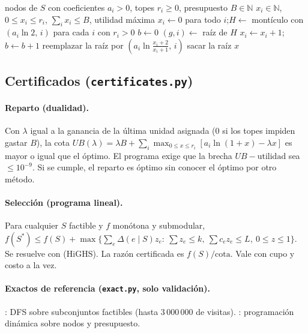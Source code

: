 \documentclass[11pt,a4paper]{article}
\newcommand{\Nat}{\mathbb{N}}
\begin{document}
\begin{algorithm}[ht]
\caption{Reparto voraz con montículo (Parte 1)}\label{alg:reparto}
\begin{algorithmic}[1]
\Require nodos de $S$ con coeficientes $a_i>0$, topes $r_i\ge 0$, presupuesto $B\in\Nat$
\Ensure $x_i\in\Nat$, $0\le x_i\le r_i$, $\sum_i x_i\le B$, utilidad máxima
\State $x_i\gets 0$ para todo $i$;\quad $H\gets$ montículo con $(a_i\ln 2,\,i)$ para cada $i$ con $r_i>0$
\State $b\gets 0$
  \State $(g,i)\gets$ raíz de $H$ 
  \State $x_i\gets x_i+1$;\quad $b\gets b+1$
   \State reemplazar la raíz por $(a_i\ln\frac{x_i+2}{x_i+1},\,i)$
  \Else \State sacar la raíz
  \EndIf
\EndWhile
\State \Return $x$
\end{algorithmic}
\end{algorithm}

\subsection{Certificados (\texttt{certificates.py})}

\paragraph{Reparto (dualidad).} Con $\lambda$ igual a la ganancia de la última unidad asignada (0 si los topes impiden gastar $B$), la cota $UB(\lambda)=\lambda B+\sum_i \max_{0\le x\le r_i}[a_i\ln(1+x)-\lambda x]$ es mayor o igual que el óptimo. El programa exige que la brecha $UB-\text{utilidad}$ sea $\le 10^{-9}$. Si se cumple, el reparto es óptimo sin conocer el óptimo por otro método.

\paragraph{Selección (programa lineal).} Para cualquier $S$ factible y $f$ monótona y submodular, $f(S^\ast)\le f(S)+\max\{\sum_e\Delta(e\mid S)z_e:\ \sum z_e\le k,\ \sum c_e z_e\le L,\ 0\le z\le 1\}$. Se resuelve con  (HiGHS). La razón certificada es $f(S)/\text{cota}$. Vale con cupo y costo a la vez.

\paragraph{Exactos de referencia (\texttt{exact.py}, solo validación).} : DFS sobre subconjuntos factibles (hasta 3\,000\,000 de visitas). : programación dinámica sobre nodos y presupuesto.
\end{document}
